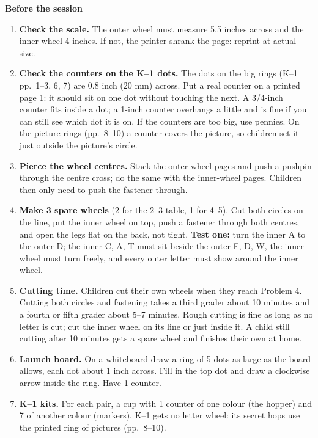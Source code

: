 \documentclass[11pt]{article}
\begin{document}
\medskip
\textbf{Before the session}
\begin{enumerate}
\item \textbf{Check the scale.} The outer wheel must measure 5.5 inches across and the inner wheel 4 inches. If
  not, the printer shrank the page: reprint at actual size.
\item \textbf{Check the counters on the K--1 dots.} The dots on the big rings (K--1 pp.\ 1--3, 6, 7) are
  0.8 inch (20 mm) across. Put a real counter on a printed page 1: it should sit on one dot without touching the
  next. A 3/4-inch counter fits inside a dot; a 1-inch counter overhangs a little and is fine if you can still see
  which dot it is on. If the counters are too big, use pennies. On the picture rings (pp.\ 8--10) a counter
  covers the picture, so children set it just outside the picture's circle.
\item \textbf{Pierce the wheel centres.} Stack the outer-wheel pages and push a pushpin through the centre cross;
  do the same with the inner-wheel pages. Children then only need to push the fastener through.
\item \textbf{Make 3 spare wheels} (2 for the 2--3 table, 1 for 4--5). Cut both circles on the line, put the
  inner wheel on top, push a fastener through both centres, and open the legs flat on the back, not tight.
  \textbf{Test one:} turn the inner A to the outer D; the inner C, A, T must sit beside the outer F, D, W, the
  inner wheel must turn freely, and every outer letter must show around the inner wheel.
\item \textbf{Cutting time.} Children cut their own wheels when they reach Problem 4. Cutting both circles and
  fastening takes a third grader about 10 minutes and a fourth or fifth grader about 5--7 minutes. Rough cutting
  is fine as long as no letter is cut; cut the inner wheel on its line or just inside it. A child still cutting
  after 10 minutes gets a spare wheel and finishes their own at home.
\item \textbf{Launch board.} On a whiteboard draw a ring of 5 dots as large as the board allows, each dot about
  1 inch across. Fill in the top dot and draw a clockwise arrow inside the ring. Have 1 counter.
\item \textbf{K--1 kits.} For each pair, a cup with 1 counter of one colour (the hopper) and 7 of another
  colour (markers). K--1 gets no letter wheel: its secret hops use the printed ring of pictures (pp.\ 8--10).
\end{enumerate}
\end{document}
